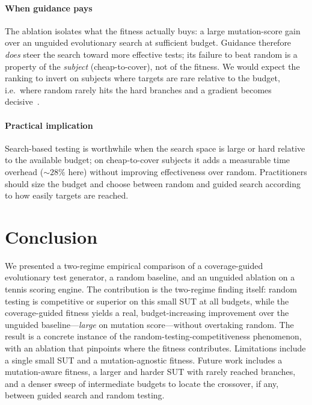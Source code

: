 \documentclass[conference]{IEEEtran}
\begin{document}
\paragraph{When guidance pays}
The ablation isolates what the fitness actually buys: a large mutation-score gain
over an unguided evolutionary search at sufficient budget. Guidance therefore
\emph{does} steer the search toward more effective tests; its failure to beat
random is a property of the \emph{subject} (cheap-to-cover), not of the fitness.
We would expect the ranking to invert on subjects where targets are rare relative
to the budget, i.e.\ where random rarely hits the hard branches and a gradient
becomes decisive~\cite{mcminn2004search,panichella2018mosa}.

\paragraph{Practical implication}
Search-based testing is worthwhile when the search space is large or hard
relative to the available budget; on cheap-to-cover subjects it adds a measurable
time overhead ($\sim\!28\%$ here) without improving effectiveness over random.
Practitioners should size the budget and choose between random and guided search
according to how easily targets are reached.

\section{Conclusion}
We presented a two-regime empirical comparison of a coverage-guided evolutionary
test generator, a random baseline, and an unguided ablation on a tennis scoring
engine. The contribution is the two-regime finding itself: random testing is
competitive or superior on this small SUT at all budgets, while the
coverage-guided fitness yields a real, budget-increasing improvement over the
unguided baseline---\emph{large} on mutation score---without overtaking random.
The result is a concrete instance of the random-testing-competitiveness
phenomenon, with an ablation that pinpoints where the fitness contributes.
Limitations include a single small SUT and a mutation-agnostic fitness. Future
work includes a mutation-aware fitness, a larger and harder SUT with rarely
reached branches, and a denser sweep of intermediate budgets to locate the
crossover, if any, between guided search and random testing.
\end{document}
